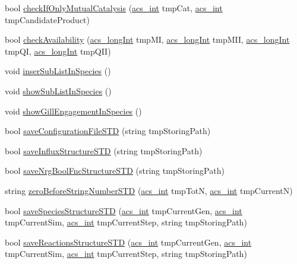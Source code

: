 \begin{DoxyCompactItemize}
\item 
bool \hyperlink{a00014_abdafaeba15b5d32fd35569869c6244d5}{check\-If\-Only\-Mutual\-Catalysis} (\hyperlink{a00050_a8d277355641a098190360234e2ebde35}{acs\-\_\-int} tmp\-Cat, \hyperlink{a00050_a8d277355641a098190360234e2ebde35}{acs\-\_\-int} tmp\-Candidate\-Product)
\item 
bool \hyperlink{a00014_ad3ebcd7ab1c9ba1a0f65b264b97adf33}{check\-Availability} (\hyperlink{a00050_a19319d75f02db4308bc5c0026d98cd85}{acs\-\_\-long\-Int} tmp\-M\-I, \hyperlink{a00050_a19319d75f02db4308bc5c0026d98cd85}{acs\-\_\-long\-Int} tmp\-M\-I\-I, \hyperlink{a00050_a19319d75f02db4308bc5c0026d98cd85}{acs\-\_\-long\-Int} tmp\-Q\-I, \hyperlink{a00050_a19319d75f02db4308bc5c0026d98cd85}{acs\-\_\-long\-Int} tmp\-Q\-I\-I)
\item 
void \hyperlink{a00014_af293fafca4582120d88f888d70d8623a}{inser\-Sub\-List\-In\-Species} ()
\item 
void \hyperlink{a00014_a5cb194f927ddc7a804a942ca71f062af}{show\-Sub\-List\-In\-Species} ()
\item 
void \hyperlink{a00014_aef1d3687767151218f3b7379dc230430}{show\-Gill\-Engagement\-In\-Species} ()
\item 
bool \hyperlink{a00014_a71f4c5ff1c11a9d61cbc818682a4a91e}{save\-Configuration\-File\-S\-T\-D} (string tmp\-Storing\-Path)
\item 
bool \hyperlink{a00014_a8f831e2db11fa5d840484345dac64fc7}{save\-Influx\-Structure\-S\-T\-D} (string tmp\-Storing\-Path)
\item 
bool \hyperlink{a00014_a1412b9b1c3bd3e42bcb481f5e18ea931}{save\-Nrg\-Bool\-Fnc\-Structure\-S\-T\-D} (string tmp\-Storing\-Path)
\item 
string \hyperlink{a00014_a8699a0f85f5e8dc23eb8f78fa22c6b17}{zero\-Before\-String\-Number\-S\-T\-D} (\hyperlink{a00050_a8d277355641a098190360234e2ebde35}{acs\-\_\-int} tmp\-Tot\-N, \hyperlink{a00050_a8d277355641a098190360234e2ebde35}{acs\-\_\-int} tmp\-Current\-N)
\item 
bool \hyperlink{a00014_a9daeb4f255100b8ad59de9ea80b19b5b}{save\-Species\-Structure\-S\-T\-D} (\hyperlink{a00050_a8d277355641a098190360234e2ebde35}{acs\-\_\-int} tmp\-Current\-Gen, \hyperlink{a00050_a8d277355641a098190360234e2ebde35}{acs\-\_\-int} tmp\-Current\-Sim, \hyperlink{a00050_a8d277355641a098190360234e2ebde35}{acs\-\_\-int} tmp\-Current\-Step, string tmp\-Storing\-Path)
\item 
bool \hyperlink{a00014_ad381c4ce24045d504539bb7c74800739}{save\-Reactions\-Structure\-S\-T\-D} (\hyperlink{a00050_a8d277355641a098190360234e2ebde35}{acs\-\_\-int} tmp\-Current\-Gen, \hyperlink{a00050_a8d277355641a098190360234e2ebde35}{acs\-\_\-int} tmp\-Current\-Sim, \hyperlink{a00050_a8d277355641a098190360234e2ebde35}{acs\-\_\-int} tmp\-Current\-Step, string tmp\-Storing\-Path)

\end{DoxyCompactItemize}
